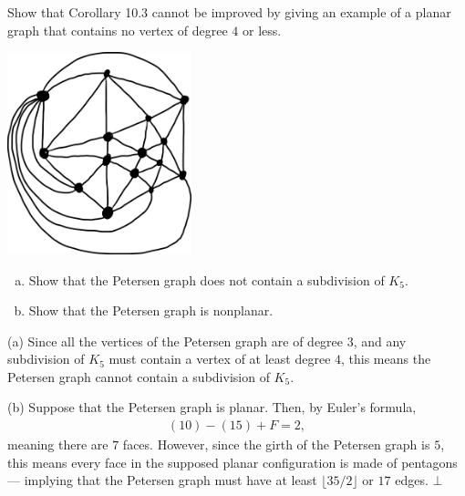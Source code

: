 \documentclass[8pt]{extarticle}
\title{}
\author{}
\date{}
\begin{document}
  \begin{problem}{4}
    Show that Corollary 10.3 cannot be improved by giving an example of a planar graph that contains no vertex of degree $4$ or less.
    \tcblower
    \begin{center}
      \includegraphics[width=0.4\textwidth]{images/10_4_sol.png}
    \end{center}
  \end{problem}
  \begin{problem}{5}
    \begin{enumerate}[(a)]
      \item Show that the Petersen graph does not contain a subdivision of $K_5$.
      \item Show that the Petersen graph is nonplanar.
    \end{enumerate}
    \tcblower
    \begin{problem}{(a)}
      Since all the vertices of the Petersen graph are of degree $3$, and any subdivision of $K_5$ must contain a vertex of at least degree $4$, this means the Petersen graph cannot contain a subdivision of $K_5$.
    \end{problem}
    \begin{problem}{(b)}
      Suppose that the Petersen graph is planar. Then, by Euler's formula,
      \begin{align*}
        (10) - (15) + F = 2,
      \end{align*}
      meaning there are $7$ faces. However, since the girth of the Petersen graph is $5$, this means every face in the supposed planar configuration is made of pentagons --- implying that the Petersen graph must have at least $\lfloor35/2\rfloor$ or $17$ edges. $\bot$
    \end{problem}
  \end{problem}
\end{document}
